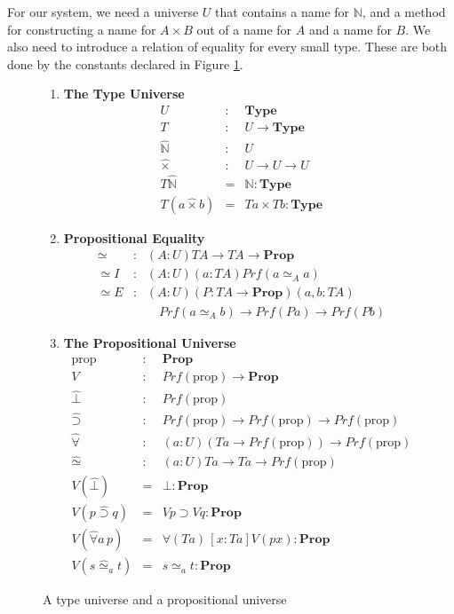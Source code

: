 \documentclass[acmtocl]{acmtrans2m}
\newcommand{\Type}{\mathbf{Type}}
\newcommand{\Prop}{\mathbf{Prop}}
\newcommand{\Prf}[1]{Prf \left( {#1} \right)}
\newcommand{\p}{\mathrm{prop}}
\begin{document}
For our system, we need a
universe $U$ that contains a name for $\mathbb{N}$, and a method for
constructing a name for $A \times B$ out of a name for $A$ and a
name for $B$.  We also need to introduce a relation of equality for every small type.  These are both done by the constants declared in Figure \ref{fig:univs}.

\begin{figure}[top]
\begin{enumerate}
 \item \textbf{The Type Universe}
\begin{eqnarray*}
 U & : & \Type \\
T & : & U \rightarrow \Type \\
\hat{\mathbb{N}} & : & U \\
\hat{\times} & : & U \rightarrow U \rightarrow U \\
T \hat{\mathbb{N}} & = & \mathbb{N} : \Type \\
T(a \hat{\times} b) & = & T a \times T b : \Type
\end{eqnarray*}
\item
\textbf{Propositional Equality}
\begin{eqnarray*}
 \simeq & : & (A : U) T A \rightarrow T A \rightarrow \Prop \\
\simeq I & : & (A : U) (a : T A) \Prf{a \simeq_A a} \\
\simeq E & : & (A : U) (P : T A \rightarrow \Prop) (a,b : T A) \\
& & \quad \Prf{a \simeq_A b} \rightarrow \Prf{P a} \rightarrow \Prf{P b}
\end{eqnarray*}
\item
\textbf{The Propositional Universe}
\begin{eqnarray*}
 \p & : & \Prop \\
V & : & \Prf{\p} \rightarrow \Prop \\
\hat{\bot} & : & \Prf{\p} \\
\hat{\supset} & : & \Prf{\p} \rightarrow \Prf{\p} \rightarrow \Prf{\p} \\
\hat{\forall} & : & (a : U) (Ta \rightarrow \Prf{\p}) \rightarrow \Prf{\p} \\
\hat{\simeq} & : & (a : U) Ta \rightarrow Ta \rightarrow \Prf{\p} \\
V(\hat{\bot}) & = & \bot : \Prop \\
V(p \hat{\supset} q) & = & V p \supset V q : \Prop \\
V(\hat{\forall} a \, p) & = & \forall  (T a) \, [x : T a] V(px) : \Prop \\
V(s \hat{\simeq}_a t) & = & s \simeq_a t : \Prop
\end{eqnarray*}
\end{enumerate}
\caption{A type universe and a propositional universe}
\label{fig:univs}
\end{figure}
\end{document}
